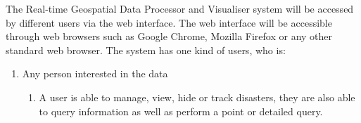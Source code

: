 The Real-time Geospatial Data Processor and Visualiser system will be accessed by different users via the web interface. The web interface will be accessible through web browsers such as Google Chrome, Mozilla Firefox or any other standard web browser.\newline  
The system has one kind of users, who is:
\begin{enumerate}	
	\item Any person interested in the data
		\begin{enumerate}
			\item A user is able to manage, view, hide or track disasters, they are also able to query information as well as perform a point or detailed query.
		\end{enumerate}
\end{enumerate}

